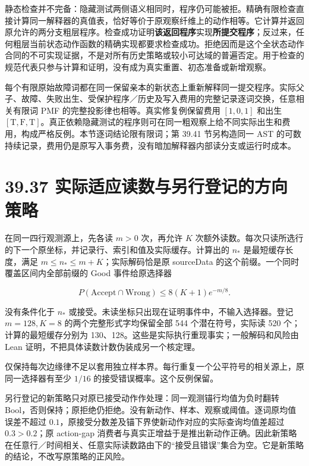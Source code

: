 \documentclass[
  11pt,
  oneside]{book}
\begin{document}
静态检查并不完备：隐藏测试两侧语义相同时，程序仍可能被拒。精确有限检查直接计算同一解释器的真值表，恰好等价于原观察纤维上的动作相等。它计算并返回原允许的两分支粗层程序。检查成功证明\textbf{该返回程序}实现\textbf{所提交程序}；反过来，任何粗层当前状态动作函数的精确实现都要求检查成功。拒绝因而是这个全状态动作合同的不可实现证据，不是对所有历史策略或较小可达域的普遍否定。用于检查的规范代表只参与计算和证明，没有成为真实重置、初态准备或新增观察。

每个有限原始故障词都在同一保留亲本的新状态上重新解释同一提交程序。实际父子、故障、失败出生、受保护程序／历史及写入费用的完整记录逐词交换，任意相关有限词 PMF 的完整投影律也相等。真实修复例保留费用 \([1,0,1]\) 和出生 \([\mathrm T,\mathrm F,\mathrm T]\)。真正依赖隐藏测试的程序则可在同一粗观察上给不同实际出生和费用，构成严格反例。本节逐词结论限有限词；第 39.41 节另构造同一 AST 的可数持续记录，费用仍是原写入事务费，没有暗加解释器内部读分支或运行时成本。

\section{39.37 实际适应读数与另行登记的方向策略}\label{ux5b9eux9645ux9002ux5e94ux8bfbux6570ux4e0eux53e6ux884cux767bux8bb0ux7684ux65b9ux5411ux7b56ux7565}

在同一四行观测源上，先各读 \(m>0\) 次，再允许 \(K\) 次额外读数。每次只读所选行的下一个原坐标，并记录行、索引和值及实际缓存。计算出的 \(n_*\) 是最短缓存长度，满足 \(m\le n_*\le m+K\)；实际解码恰是原 sourceData 的这个前缀。一个同时覆盖区间内全部前缀的 Good 事件给原选择器

\[P(\mathrm{Accept}\cap\mathrm{Wrong})\le8(K+1)e^{-m/8}.\]

没有条件化于 \(n_*\) 或接受。未读坐标只出现在证明事件中，不输入选择器。登记 \(m=128,K=8\) 的两个完整形式字均保留全部 544 个潜在符号，实际读 520 个；计算的最短缓存分别为 130、128。这些是实际执行重现事实；一般解码和风险由 Lean 证明，不把具体读数计数伪装成另一个核定理。

仅保持每次边缘律不足以套用独立样本界。每行重复一个公平符号的相关源上，原同一选择器有至少 \(1/16\) 的接受错误概率。这个反例保留。

另行登记的新策略只对原已接受动作作处理：同一观测锚行均值为负时翻转 Bool，否则保持；原拒绝仍拒绝。没有新动作、样本、观察或阈值。逐词原均值误差不超过 \(0.1\)，原接受分数差及锚下界使新动作对应的实际查询均值差超过 \(0.3>0.2\)；原 action-gap 消费者与真实正增益于是推出新动作正确。因此新策略在任意行／时间相关、任意实际读数路由下的``接受且错误''集合为空。它是新策略的结论，不改写原策略的正风险。
\end{document}
